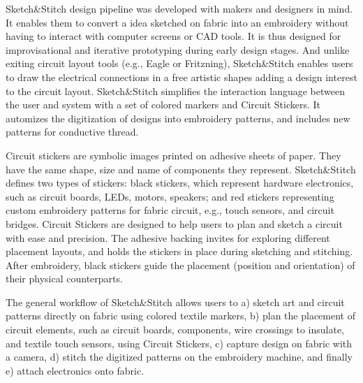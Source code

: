 \documentclass[header.tex]{subfiles}
\begin{document}
Sketch\&Stitch design pipeline was developed with makers and designers in mind. It enables them to convert a idea sketched on fabric into an embroidery without having to interact with computer screens or CAD tools. It is thus designed for improvisational and iterative prototyping during early design stages. And unlike exiting circuit layout tools (e.g., Eagle or Fritzning), Sketch\&Stitch enables users to draw the electrical connections in a free artistic shapes adding a design interest to the circuit layout.
Sketch\&Stitch simplifies the interaction language between the user and system with a set of colored markers and Circuit Stickers. It automizes the digitization of designs into embroidery patterns, and includes new patterns for conductive thread. 

Circuit stickers are symbolic images printed on adhesive sheets of paper. They have the same shape, size and name of components they represent. Sketch\&Stitch defines two types of stickers: black stickers, which represent hardware electronics, such as circuit boards, LEDs, motors, speakers; and red stickers representing custom embroidery patterns for fabric circuit, e.g., touch sensors, and circuit bridges. Circuit Stickers are designed to help users to plan and sketch a circuit with ease and precision. The adhesive backing invites for exploring different placement layouts, and holds the stickers in place during sketching and stitching. After embroidery, black stickers guide the placement (position and orientation) of their physical counterparts.


The general workflow of Sketch\&Stitch allows users to a) sketch art and circuit patterns directly on fabric using colored textile markers, b) plan the placement of circuit elements, such as circuit boards, components, wire crossings to insulate, and textile touch sensors, using Circuit Stickers, c) capture design on fabric with a camera, d) stitch the digitized patterns on the embroidery machine, and finally e) attach electronics onto fabric.

\end{document}
